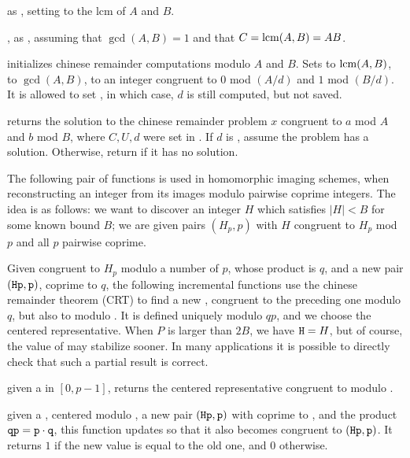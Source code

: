  as
, setting  to the lcm of $A$ and $B$.

, as
, assuming that $\gcd(A,B) = 1$ and that $C = {\rm lcm}(A,B) = AB$.

initializes chinese remainder computations modulo $A$ and $B$. Sets
 to ${\rm lcm}(A,B)$,  to $\gcd(A,B)$,
 to an integer congruent to $0$ mod $(A/d)$ and $1$ mod $(B/d)$.
It is allowed to set , in which case, $d$ is still
computed, but not saved.

 returns
the solution to the chinese remainder problem $x$ congruent
to $a$ mod $A$ and $b$ mod $B$, where $C, U, d$ were set in
. If $d$ is , assume the problem has a
solution. Otherwise, return  if it has no solution.

\medskip

The following pair of functions is used in homomorphic imaging schemes,
when reconstructing an integer from its images modulo pairwise coprime
integers. The idea is as follows: we want to discover an integer $H$ which
satisfies $|H| < B$ for some known bound $B$; we are given pairs $(H_p, p)$
with $H$ congruent to $H_p$ mod $p$ and all $p$ pairwise coprime.

Given  congruent to $H_p$ modulo a number of $p$, whose product is
$q$, and a new pair $({\tt Hp}, {\tt p})$,  coprime to $q$, the
following incremental functions use the chinese remainder theorem (CRT) to
find a new , congruent to the preceding one modulo $q$, but also to
 modulo . It is defined uniquely modulo $qp$, and we choose
the centered representative. When $P$ is larger than $2B$, we have ${\tt H} =
H$, but of course, the value of  may stabilize sooner. In many
applications it is possible to directly check that such a partial result is
correct.

 given a   in
$[0, p-1]$, returns the centered representative  congruent to 
modulo .

given a  , centered modulo , a new pair $({\tt Hp},
{\tt p})$ with  coprime to , and the product ${\tt qp} = {\tt p}
\cdot {\tt q}$, this function updates  so that it also becomes
congruent to $({\tt Hp}, {\tt p})$. It returns $1$ if the new value is equal
to the old one, and $0$ otherwise.

